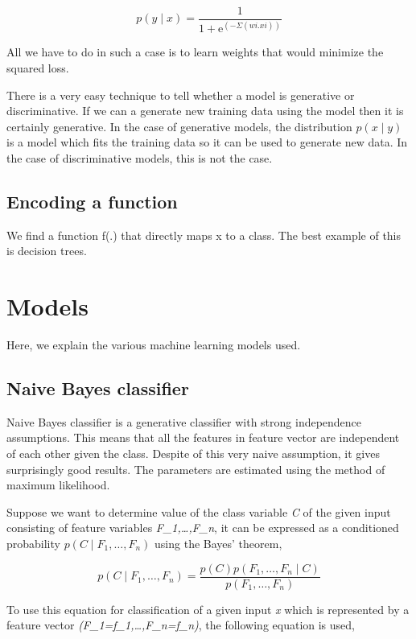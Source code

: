 \begin{equation}
  p(y\mid x) = \frac{1}{1 + \mathrm{e}^{(-\Sigma(wi.xi))}}
\end{equation}

All we have to do in such a case is to learn weights that would minimize the squared loss.

\par
There is a very easy technique to tell whether a model is generative or discriminative. If we can a generate new training data
using the model then it is certainly generative. In the case of generative models, the distribution \(p(x\mid y)\) is a model 
which fits the training data so it can be used to generate new data. In the case of discriminative models, this is not the case.

\subsection{Encoding a function}
We find a function f(.) that directly maps x to a class. The best example of this is decision trees. 

\section{Models}

Here, we explain the various machine learning models used.

\subsection{Naive Bayes classifier}
\par
Naive Bayes classifier is a generative classifier with strong independence assumptions. This means that all the features in feature
vector are independent of each other given the class. Despite of this very naive assumption, it gives surprisingly good results.
The parameters are estimated using the method of maximum likelihood.

Suppose we want to determine value of the class variable \textit{C} of the given input consisting of feature variables \textit{F_1,\dots,F_n}, 
it can be expressed as a conditioned probability \(p(C\mid F_1,\dots,F_n)\) using the Bayes' theorem,

\begin{equation}  
p(C\mid F_1,\dots,F_n) = \frac{p(C)p(F_1,\dots,F_n\mid C)}{p(F_1,\dots,F_n)}
\end{equation}

To use this equation for classification of a given input \textit{x} which is represented by a feature vector \textit{(F_1=f_1,\dots,F_n=f_n)},
the following equation is used,

